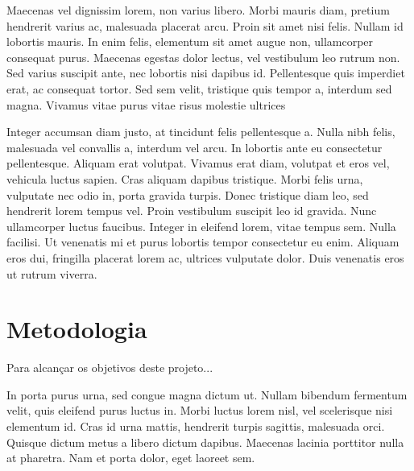 {Maecenas vel dignissim lorem, non varius libero. Morbi mauris diam,
pretium hendrerit varius ac, malesuada placerat arcu. Proin sit amet
nisi felis. Nullam id lobortis mauris. In enim felis, elementum sit
amet augue non, ullamcorper consequat purus. Maecenas egestas dolor
lectus, vel vestibulum leo rutrum non. Sed varius suscipit ante, nec
lobortis nisi dapibus id. Pellentesque quis imperdiet erat, ac
consequat tortor. Sed sem velit, tristique quis tempor a, interdum sed
magna. Vivamus vitae purus vitae risus molestie ultrices}
{\cite{sampaio12:teoria}}

Integer accumsan diam justo, at tincidunt felis pellentesque a. Nulla
nibh felis, malesuada vel convallis a, interdum vel arcu. In lobortis
ante eu consectetur pellentesque. Aliquam erat volutpat. Vivamus erat
diam, volutpat et eros vel, vehicula luctus sapien. Cras aliquam
dapibus tristique. Morbi felis urna, vulputate nec odio in, porta
gravida turpis. Donec tristique diam leo, sed hendrerit lorem tempus
vel. Proin vestibulum suscipit leo id gravida. Nunc ullamcorper luctus
faucibus. Integer in eleifend lorem, vitae tempus sem. Nulla facilisi.
Ut venenatis mi et purus lobortis tempor consectetur eu enim. Aliquam
eros dui, fringilla placerat lorem ac, ultrices vulputate dolor. Duis
venenatis eros ut rutrum viverra.

\section{Metodologia}
\label{sec:metodologia}

Para alcançar os objetivos deste projeto...

In porta purus urna, sed congue magna dictum ut. Nullam bibendum
fermentum velit, quis eleifend purus luctus in. Morbi luctus lorem
nisl, vel scelerisque nisi elementum id. Cras id urna mattis,
hendrerit turpis sagittis, malesuada orci. Quisque dictum metus a
libero dictum dapibus. Maecenas lacinia porttitor nulla at pharetra.
Nam et porta dolor, eget laoreet sem.

